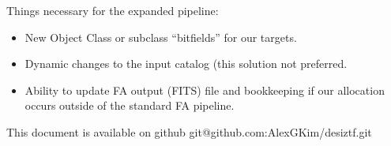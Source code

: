 \documentclass[11pt]{article}   	%
\begin{document}
Things necessary for the expanded pipeline:
\begin{itemize}
\item New  Object Class or subclass ``bitfields'' for our targets.
\item Dynamic changes to the input catalog (this solution not preferred.
\item  Ability to update FA output (FITS) file and bookkeeping if our allocation occurs outside of the standard FA pipeline.
\end{itemize}


This document is available on github git@github.com:AlexGKim/desiztf.git

\begin{comment}
\section{Properties of the ZTF Survey}

\subsection{Survey area}
ZTF will survey the visible sky from Palomar with few day cadence, which 
sets a dec$>-30$ limit.
Most SN searches will skip the galactic plane, so galactic latidue $>~ 
13$. The galactic plane is (frequently) observed but is typically skipped 
for SN searches to limit stellar variability. As a nominal survey, every 
field visible at Palomar at dec$>-30$ and b$>13$ will be observed every 
~third day.
[We could make a figure of the sensitive area vs time during the year if 
needed.]

\subsection{ZTF SN search season}
Palomar winter weather is worse, which will both reduce search 
efficiency and lc quality.
We therefore assume 300 search days/year.
As with covering the galactic fields, the ZTF survey will be operating 
the full year and there will be SNe found also here.
Not assuming searching the full year also allows for some instrumental 
downtimes.

\subsection{What ZTF is  searching for}
Looking for efficient, complete SNIa program. Means looking for smoothly 
rising transients which are rising >7 days from the 20.5 ZTF detection 
limit and peaking at <19.5 mag and with multi-band lc compatible with 
SNIa. Translates into very efficient (pure) selection of transients for 
spectroscopic follow-up.
Loosing these requirements (detection, peak, lc-fit) would rapidly 
increase the number of candidates. This is not assumed here. For a large 
DESI program, especially looking for early transients or more complete 
samples this could make sense.



\end{comment}
\end{document}
